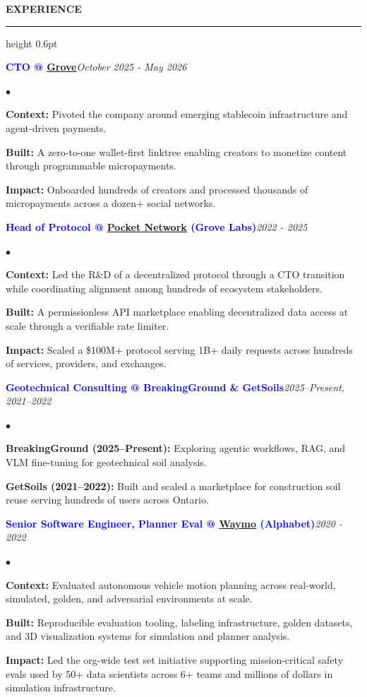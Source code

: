 \documentclass[10pt]{resume}
\newenvironment{rSectionCompact}[1]{
  \medskip
  \vspace{0.45em}
  \textbf{\textcolor{Cerulean}{\MakeUppercase{#1}}}
  \vspace{0.3em}
  {\color{Blue}\hrule height 0.6pt}
  \vspace{0.85em}
  \begin{list}{}{
    \setlength{\leftmargin}{0em}
  }
  \item[]
}{
    \vspace{0.25em}
    \end{list}
}
\newenvironment{rJobCompact}[2]{
  \normalsize
  \textcolor{Blue}{\textbf{#1}}\hfill\textit{#2}
  \vspace{0.08em}
  \begin{list}{$\bullet$}{
    \setlength{\leftmargin}{1.6em}
    \setlength{\itemsep}{-0.05em}
    \setlength{\topsep}{0pt}
    \setlength{\partopsep}{0pt}
    \setlength{\parsep}{0pt}
  }
}{
    \end{list}
    \vspace{0.42em}
}
\begin{document}
\begin{rSectionCompact}{Experience}

    \begin{rJobCompact}{CTO @ \href{https://grove.city}{Grove}}{October 2025 - May 2026}
        \item \textbf{Context:} Pivoted the company around emerging stablecoin infrastructure and agent-driven payments.
        \item \textbf{Built:} A zero-to-one wallet-first linktree enabling creators to monetize content through programmable micropayments.
        \item \textbf{Impact:} Onboarded hundreds of creators and processed thousands of micropayments across a dozen+ social networks.
    \end{rJobCompact}

    \begin{rJobCompact}{Head of Protocol @ \href{https://pokt.network}{Pocket Network} (Grove Labs)}{2022 - 2025}
        \item \textbf{Context:} Led the R\&D of a decentralized protocol through a CTO transition while coordinating alignment among hundreds of ecosystem stakeholders.
        \item \textbf{Built:} A permissionless API marketplace enabling decentralized data access at scale through a verifiable rate limiter.
        \item \textbf{Impact:} Scaled a \$100M+ protocol serving 1B+ daily requests across hundreds of services, providers, and exchanges.
    \end{rJobCompact}

    \begin{rJobCompact}{Geotechnical Consulting @ BreakingGround \& GetSoils}{2025--Present, 2021--2022}
        \item \textbf{BreakingGround (2025--Present):} Exploring agentic workflows, RAG, and VLM fine-tuning for geotechnical soil analysis.
        \item \textbf{GetSoils (2021--2022):} Built and scaled a marketplace for construction soil reuse serving hundreds of users across Ontario.
    \end{rJobCompact}

    \begin{rJobCompact}{Senior Software Engineer, Planner Eval @ \href{https://waymo.com}{Waymo} (Alphabet)}{2020 - 2022}
        \item \textbf{Context:} Evaluated autonomous vehicle motion planning across real-world, simulated, golden, and adversarial environments at scale.
        \item \textbf{Built:} Reproducible evaluation tooling, labeling infrastructure, golden datasets, and 3D visualization systems for simulation and planner analysis.
        \item \textbf{Impact:} Led the org-wide test set initiative supporting mission-critical safety evals used by 50+ data scientists across 6+ teams and millions of dollars in simulation infrastructure.
    \end{rJobCompact}


\end{rSectionCompact}
\end{document}
